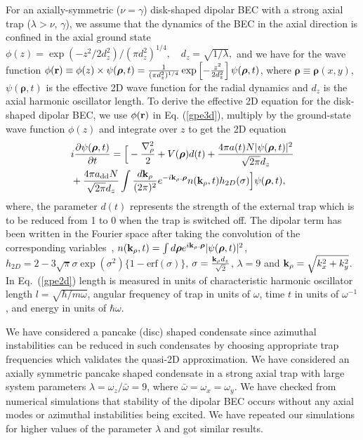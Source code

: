 \documentclass[amsmath,amssymb,article,twocolumn,superscriptaddress,showpacs,10pt]{revtex4-1}
\begin{document}
For an axially-symmetric ($\nu=\gamma$) disk-shaped dipolar BEC with a strong axial trap ($\lambda > \nu$, $\gamma$), we assume that the dynamics of the BEC in the axial direction is confined in the axial ground state $\phi(z)=\exp(-z^2 /2d_z^2)/(\pi d_z^2)^{1/4}, \quad d_z= \sqrt{1/\lambda},$ and we have for the wave function $\phi({\bf r})\equiv \phi(z) \times \psi(\boldsymbol{\rho},t)=\frac{1}{(\pi d_z^2)^{1/4}}\exp\left[-\frac{z^2}{2d_z^2}  \right] \psi(\boldsymbol{\rho},t)$, where  $\boldsymbol{\rho} \equiv \boldsymbol{\rho}(x,y)$, $\psi(\boldsymbol{\rho},t)$ is the effective 2D wave function for the radial dynamics and $d_z$ is the axial  harmonic oscillator length. To derive the effective 2D equation for the disk-shaped dipolar BEC, we use $\phi({\bf r})$ in Eq. (\ref{gpe3d}), multiply by the ground-state wave function $\phi(z)$ and integrate over $z$ to get the 2D equation\cite{Muruganandam:2012,Lahaye:2008}
\begin{align}
\begin{split}
&i\frac{\partial \psi(\boldsymbol{\rho},t)}{\partial t}=\Big[-\frac{\nabla_\rho^2}{2}+V(\boldsymbol{\rho})d(t)+\frac{4\pi a(t)N \vert  \psi(\boldsymbol{\rho},t)\vert^2}{\sqrt{2\pi}d_z}\\
&+ \frac{ 4\pi a_{\mathrm{dd}}N}{\sqrt{2\pi}d_z}\int \frac{d{\bf k}_\rho}{(2\pi)^2} e^{-i{\bf k}_\rho.\boldsymbol{\rho}} n({\bf k}_\rho,t)h_{2D}(\sigma)\Big] \psi(\boldsymbol{\rho},t),\label{gpe2d}
\end{split}
\end{align}
where, the parameter $d(t)$ represents the strength of the external trap which is to be reduced from 1 to 0 when the trap is switched off.   
%
The dipolar term has been written in the Fourier space after taking the convolution of the corresponding variables~\cite{Muruganandam:2012}, $n({\bf k}_\rho,t)=\int d\boldsymbol{\rho} e^{i{\bf k}_\rho.\boldsymbol{\rho}} \vert \psi(\boldsymbol{\rho},t) \vert^2$, $ h_{2D}= 2-3\sqrt \pi \sigma \exp(\sigma^2)\{1-\text{erf}(\sigma)\}$, $\sigma=\frac{{\bf k}_\rho d_z}{\sqrt 2}$, $\lambda=9$  and ${\bf k}_\rho=\sqrt{k_x^2+k_y^2}$. In Eq.~(\ref{gpe2d}) length is measured in units of characteristic harmonic oscillator length $l =\sqrt{\hbar/m\omega} $, angular frequency of trap in units of $\omega$, time $t$ in units of $\omega^{-1}$, and energy in units of $\hbar\omega$.

We have considered a pancake (disc) shaped condensate since azimuthal instabilities can be reduced in such condensates by choosing appropriate trap frequencies which validates the quasi-2D approximation. We have considered an axially symmetric pancake  shaped condensate in a strong axial trap  with large system parameters $\lambda = \omega_z/\bar\omega = 9$, where $\bar\omega =\omega_x=\omega_y$. We have checked from numerical simulations that stability of the dipolar BEC occurs without any axial modes or azimuthal instabilities being excited. We have repeated our simulations for higher values of the parameter $\lambda$ and got similar results.
\end{document}
